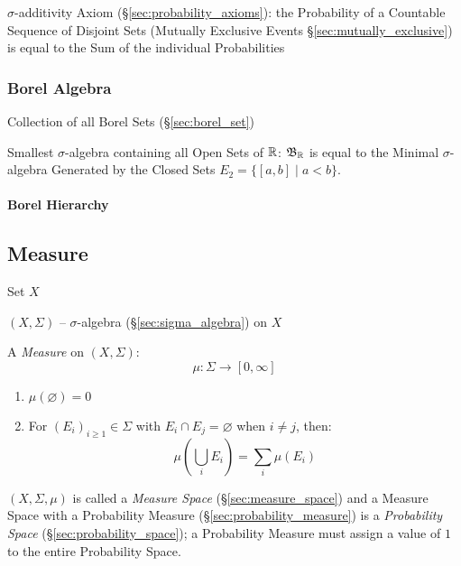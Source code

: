 \fist $\sigma$-additivity Axiom (\S\ref{sec:probability_axioms}): the
Probability of a Countable Sequence of Disjoint Sets (Mutually Exclusive Events
\S\ref{sec:mutually_exclusive}) is equal to the Sum of the individual
Probabilities



\subsubsection{Borel Algebra}\label{sec:borel_algebra}

Collection of all Borel Sets (\S\ref{sec:borel_set})

Smallest $\sigma$-algebra containing all Open Sets of $\mathbb{R}$:
$\mathfrak{B}_{\mathbb{R}}$ is equal to the Minimal $\sigma$-algebra Generated by the
Closed Sets $E_2 = \{ [a,b] \;|\; a < b \}$.



\paragraph{Borel Hierarchy}\label{sec:borel_hierarchy}\hfill



\subsection{Measure}\label{sec:measure}

Set $X$

$(X,\Sigma)$ -- $\sigma$-algebra (\S\ref{sec:sigma_algebra}) on $X$

A \emph{Measure} on $(X,\Sigma)$:
\[
  \mu : \Sigma \rightarrow [0,\infty]
\]

\begin{enumerate}
  \item $\mu(\varnothing) = 0$

  \item For $(E_i)_{i \geq 1} \in \Sigma$ with $E_i \cap E_j =
    \varnothing$ when $i \neq j$, then:
    \[
      \mu (\bigcup_i E_i) = \sum_i \mu(E_i)
    \]
\end{enumerate}

$(X,\Sigma,\mu)$ is called a \emph{Measure Space} (\S\ref{sec:measure_space})
and a Measure Space with a Probability Measure
(\S\ref{sec:probability_measure}) is a \emph{Probability Space}
(\S\ref{sec:probability_space}); a Probability Measure must assign a value of
$1$ to the entire Probability Space.

